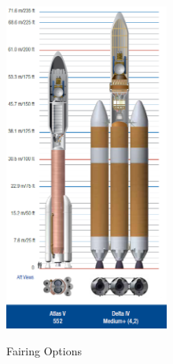 \begin{figure}[htb!]
{        \includegraphics[width=0.48\textwidth]{figures/Orbiter/launchv.png}
        \label{fig:fairings_v_iv_compare}
    }
    \caption{Fairing Options}\label{fig:fairings}
\end{figure}
